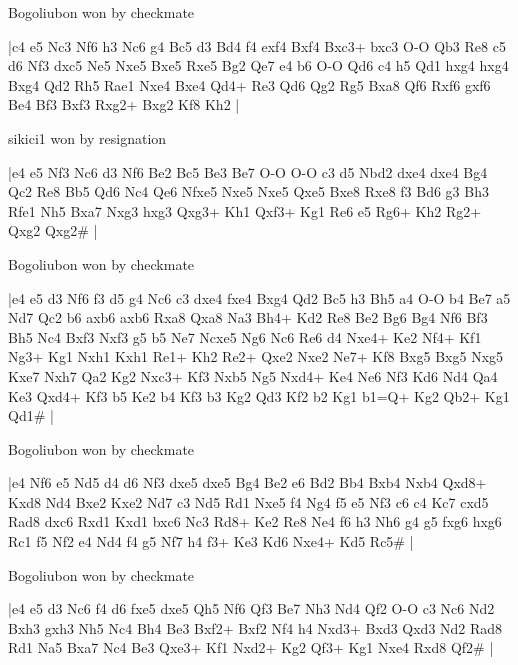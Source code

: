 \showboard

Bogoliubon won by checkmate

\makegametitle
|c4 e5 Nc3 Nf6 h3 Nc6 g4 Bc5 d3 Bd4 f4 exf4 Bxf4 Bxc3+ bxc3 O-O Qb3 Re8 c5 d6 Nf3 dxc5 Ne5 Nxe5 Bxe5 Rxe5 Bg2 Qe7 e4 b6 O-O Qd6 c4 h5 Qd1 hxg4 hxg4 Bxg4 Qd2 Rh5 Rae1 Nxe4 Bxe4 Qd4+ Re3 Qd6 Qg2 Rg5 Bxa8 Qf6 Rxf6 gxf6 Be4 Bf3 Bxf3 Rxg2+ Bxg2 Kf8 Kh2  |

\showboard

sikici1 won by resignation

\makegametitle
|e4 e5 Nf3 Nc6 d3 Nf6 Be2 Bc5 Be3 Be7 O-O O-O c3 d5 Nbd2 dxe4 dxe4 Bg4 Qc2 Re8 Bb5 Qd6 Nc4 Qe6 Nfxe5 Nxe5 Nxe5 Qxe5 Bxe8 Rxe8 f3 Bd6 g3 Bh3 Rfe1 Nh5 Bxa7 Nxg3 hxg3 Qxg3+ Kh1 Qxf3+ Kg1 Re6 e5 Rg6+ Kh2 Rg2+ Qxg2 Qxg2\#  |

\showboard

Bogoliubon won by checkmate

\makegametitle
|e4 e5 d3 Nf6 f3 d5 g4 Nc6 c3 dxe4 fxe4 Bxg4 Qd2 Bc5 h3 Bh5 a4 O-O b4 Be7 a5 Nd7 Qc2 b6 axb6 axb6 Rxa8 Qxa8 Na3 Bh4+ Kd2 Re8 Be2 Bg6 Bg4 Nf6 Bf3 Bh5 Nc4 Bxf3 Nxf3 g5 b5 Ne7 Ncxe5 Ng6 Nc6 Re6 d4 Nxe4+ Ke2 Nf4+ Kf1 Ng3+ Kg1 Nxh1 Kxh1 Re1+ Kh2 Re2+ Qxe2 Nxe2 Ne7+ Kf8 Bxg5 Bxg5 Nxg5 Kxe7 Nxh7 Qa2 Kg2 Nxc3+ Kf3 Nxb5 Ng5 Nxd4+ Ke4 Ne6 Nf3 Kd6 Nd4 Qa4 Ke3 Qxd4+ Kf3 b5 Ke2 b4 Kf3 b3 Kg2 Qd3 Kf2 b2 Kg1 b1=Q+ Kg2 Qb2+ Kg1 Qd1\#  |

\showboard

Bogoliubon won by checkmate

\makegametitle
|e4 Nf6 e5 Nd5 d4 d6 Nf3 dxe5 dxe5 Bg4 Be2 e6 Bd2 Bb4 Bxb4 Nxb4 Qxd8+ Kxd8 Nd4 Bxe2 Kxe2 Nd7 c3 Nd5 Rd1 Nxe5 f4 Ng4 f5 e5 Nf3 c6 c4 Kc7 cxd5 Rad8 dxc6 Rxd1 Kxd1 bxc6 Nc3 Rd8+ Ke2 Re8 Ne4 f6 h3 Nh6 g4 g5 fxg6 hxg6 Rc1 f5 Nf2 e4 Nd4 f4 g5 Nf7 h4 f3+ Ke3 Kd6 Nxe4+ Kd5 Rc5\#  |

\showboard

Bogoliubon won by checkmate

\makegametitle
|e4 e5 d3 Nc6 f4 d6 fxe5 dxe5 Qh5 Nf6 Qf3 Be7 Nh3 Nd4 Qf2 O-O c3 Nc6 Nd2 Bxh3 gxh3 Nh5 Nc4 Bh4 Be3 Bxf2+ Bxf2 Nf4 h4 Nxd3+ Bxd3 Qxd3 Nd2 Rad8 Rd1 Na5 Bxa7 Nc4 Be3 Qxe3+ Kf1 Nxd2+ Kg2 Qf3+ Kg1 Nxe4 Rxd8 Qf2\#  |

